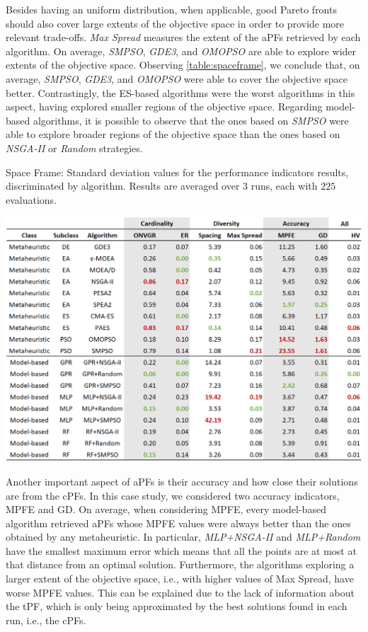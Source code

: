 Besides having an uniform distribution, when applicable, good Pareto fronts should also cover large extents of the objective space in order to provide more relevant trade-offs. \textit{Max Spread} measures the extent of the \acp{aPF} retrieved by each algorithm. On average, \textit{SMPSO}, \textit{GDE3}, and \textit{OMOPSO} are able to explore wider extents of the objective space. Observing \cref{table:spaceframe}, we conclude that, on average, \textit{SMPSO}, \textit{GDE3}, and \textit{OMOPSO} were able to cover the objective space better. Contrastingly, the \ac{ES}-based algorithms were the worst algorithms in this aspect, having explored smaller regions of the objective space. Regarding model-based algorithms, it is possible to observe that the ones based on \textit{SMPSO} were able to explore broader regions of the objective space than the ones based on \textit{NSGA-II} or \textit{Random} strategies. 
\begin{table}[]
	\centering
	\caption[Space Frame: Standard deviation values for the performance indicators results, discriminated by each algorithm]{Space Frame: Standard deviation values for the performance indicators results, discriminated by algorithm. Results are averaged over $3$ runs, each with $225$ evaluations.}
	\label{table:spaceframestd}
	\includegraphics[width=\textwidth]{Images/Evaluation/caadria/Results_Std_20190428.PNG}
\end{table}

Another important aspect of \acp{aPF} is their accuracy and how close their solutions are from the \acp{cPF}. In this case study, we considered two accuracy indicators, \ac{MPFE} and \ac{GD}. On average, when considering \ac{MPFE}, every model-based algorithm retrieved \acp{aPF} whose \ac{MPFE} values were always better than the ones obtained by any metaheuristic. In particular, \textit{MLP+NSGA-II} and \textit{MLP+Random} have the smallest maximum error which means that all the points are at most at that distance from an optimal solution. Furthermore, the algorithms exploring a larger extent of the objective space, i.e., with higher values of Max Spread, have worse \ac{MPFE} values. This can be explained due to the lack of information about the \ac{tPF}, which is only being approximated by the best solutions found in each run, i.e., the \acp{cPF}. 

